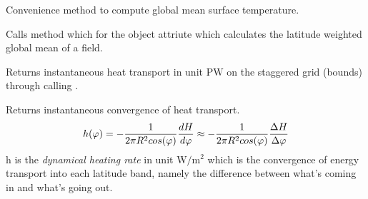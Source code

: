 \documentclass[letterpaper,10pt,english]{sphinxmanual}
\begin{document}
\begin{fulllineitems}
\begin{fulllineitems}
\begin{quote}
\begin{description}
\end{description}\end{quote}

\end{fulllineitems}


\begin{fulllineitems}
\label{api/climlab.model:climlab.model.ebm.EBM.global_mean_temperature}
Convenience method to compute global mean surface temperature.

Calls {\hyperref[api/climlab.domain:climlab.domain.field.global_mean]{\emph{}}} method which
for the object attriute  which calculates the latitude weighted
global mean of a field.

\end{fulllineitems}


\begin{fulllineitems}
\label{api/climlab.model:climlab.model.ebm.EBM.heat_transport}
Returns instantaneous heat transport in unit \(\textrm{PW}\)
on the staggered grid (bounds) through calling {\hyperref[api/climlab.model:climlab.model.ebm.EBM.diffusive_heat_transport]{\emph{}}}.

\end{fulllineitems}


\begin{fulllineitems}
\label{api/climlab.model:climlab.model.ebm.EBM.heat_transport_convergence}
Returns instantaneous convergence of heat transport.
\begin{gather}
\begin{split}h(\varphi) = - \frac{1}{2 \pi R^2 cos(\varphi)} \frac{dH}{d\varphi} 
            \approx - \frac{1}{2 \pi R^2 cos(\varphi)} \frac{\Delta H}{\Delta \varphi} \end{split}\notag
\end{gather}
h is the \emph{dynamical heating rate} in unit \(\textrm{W}/ \textrm{m}^2\)
which is the convergence of energy transport into each latitude band,
namely the difference between what's coming in and what's going out.


\end{fulllineitems}
\end{fulllineitems}
\end{document}
